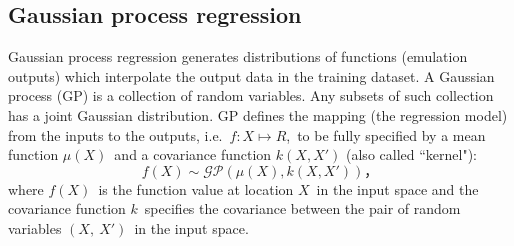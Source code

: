 \documentclass[review]{elsarticle}
\newcommand{\tcb}[1]{{#1}}
\begin{document}
\subsection{Gaussian process regression}
Gaussian process regression generates distributions of functions (emulation outputs) which interpolate the output data in the training dataset. A Gaussian process (GP) is a collection of random variables. Any subsets of such collection has a joint Gaussian distribution. GP defines the mapping (the regression model) from the inputs to the outputs, i.e.~$f:X\mapsto R$,~to be fully specified by a mean function $\mu(X)$~and a covariance function $k(X,X')$ (also called ``kernel"):
\begin{equation}
f(X)\sim \mathcal{GP}(\mu(X),k(X,X'))，
\end{equation}
\tcb{where $f(X)$\ is the function value at location $X$\ in the input space and the covariance function $k$\ specifies the covariance between the pair of random variables $(X,\ X')$\ in the input space.}
\end{document}
